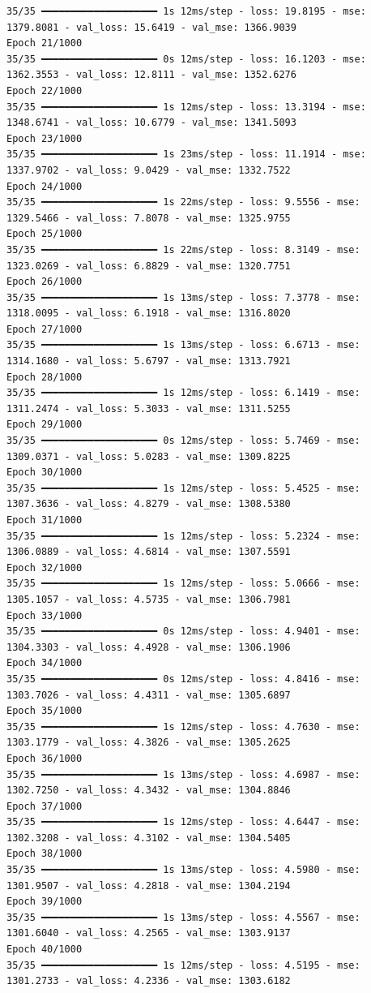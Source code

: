 \documentclass[
  letterpaper,
  DIV=11,
  numbers=noendperiod]{scrreprt}
\begin{document}
\begin{verbatim}
35/35 ━━━━━━━━━━━━━━━━━━━━ 1s 12ms/step - loss: 19.8195 - mse: 1379.8081 - val_loss: 15.6419 - val_mse: 1366.9039
Epoch 21/1000
35/35 ━━━━━━━━━━━━━━━━━━━━ 0s 12ms/step - loss: 16.1203 - mse: 1362.3553 - val_loss: 12.8111 - val_mse: 1352.6276
Epoch 22/1000
35/35 ━━━━━━━━━━━━━━━━━━━━ 1s 12ms/step - loss: 13.3194 - mse: 1348.6741 - val_loss: 10.6779 - val_mse: 1341.5093
Epoch 23/1000
35/35 ━━━━━━━━━━━━━━━━━━━━ 1s 23ms/step - loss: 11.1914 - mse: 1337.9702 - val_loss: 9.0429 - val_mse: 1332.7522
Epoch 24/1000
35/35 ━━━━━━━━━━━━━━━━━━━━ 1s 22ms/step - loss: 9.5556 - mse: 1329.5466 - val_loss: 7.8078 - val_mse: 1325.9755
Epoch 25/1000
35/35 ━━━━━━━━━━━━━━━━━━━━ 1s 22ms/step - loss: 8.3149 - mse: 1323.0269 - val_loss: 6.8829 - val_mse: 1320.7751
Epoch 26/1000
35/35 ━━━━━━━━━━━━━━━━━━━━ 1s 13ms/step - loss: 7.3778 - mse: 1318.0095 - val_loss: 6.1918 - val_mse: 1316.8020
Epoch 27/1000
35/35 ━━━━━━━━━━━━━━━━━━━━ 1s 13ms/step - loss: 6.6713 - mse: 1314.1680 - val_loss: 5.6797 - val_mse: 1313.7921
Epoch 28/1000
35/35 ━━━━━━━━━━━━━━━━━━━━ 1s 12ms/step - loss: 6.1419 - mse: 1311.2474 - val_loss: 5.3033 - val_mse: 1311.5255
Epoch 29/1000
35/35 ━━━━━━━━━━━━━━━━━━━━ 0s 12ms/step - loss: 5.7469 - mse: 1309.0371 - val_loss: 5.0283 - val_mse: 1309.8225
Epoch 30/1000
35/35 ━━━━━━━━━━━━━━━━━━━━ 1s 12ms/step - loss: 5.4525 - mse: 1307.3636 - val_loss: 4.8279 - val_mse: 1308.5380
Epoch 31/1000
35/35 ━━━━━━━━━━━━━━━━━━━━ 1s 12ms/step - loss: 5.2324 - mse: 1306.0889 - val_loss: 4.6814 - val_mse: 1307.5591
Epoch 32/1000
35/35 ━━━━━━━━━━━━━━━━━━━━ 1s 12ms/step - loss: 5.0666 - mse: 1305.1057 - val_loss: 4.5735 - val_mse: 1306.7981
Epoch 33/1000
35/35 ━━━━━━━━━━━━━━━━━━━━ 0s 12ms/step - loss: 4.9401 - mse: 1304.3303 - val_loss: 4.4928 - val_mse: 1306.1906
Epoch 34/1000
35/35 ━━━━━━━━━━━━━━━━━━━━ 0s 12ms/step - loss: 4.8416 - mse: 1303.7026 - val_loss: 4.4311 - val_mse: 1305.6897
Epoch 35/1000
35/35 ━━━━━━━━━━━━━━━━━━━━ 1s 12ms/step - loss: 4.7630 - mse: 1303.1779 - val_loss: 4.3826 - val_mse: 1305.2625
Epoch 36/1000
35/35 ━━━━━━━━━━━━━━━━━━━━ 1s 13ms/step - loss: 4.6987 - mse: 1302.7250 - val_loss: 4.3432 - val_mse: 1304.8846
Epoch 37/1000
35/35 ━━━━━━━━━━━━━━━━━━━━ 1s 12ms/step - loss: 4.6447 - mse: 1302.3208 - val_loss: 4.3102 - val_mse: 1304.5405
Epoch 38/1000
35/35 ━━━━━━━━━━━━━━━━━━━━ 1s 13ms/step - loss: 4.5980 - mse: 1301.9507 - val_loss: 4.2818 - val_mse: 1304.2194
Epoch 39/1000
35/35 ━━━━━━━━━━━━━━━━━━━━ 1s 13ms/step - loss: 4.5567 - mse: 1301.6040 - val_loss: 4.2565 - val_mse: 1303.9137
Epoch 40/1000
35/35 ━━━━━━━━━━━━━━━━━━━━ 1s 12ms/step - loss: 4.5195 - mse: 1301.2733 - val_loss: 4.2336 - val_mse: 1303.6182

\end{verbatim}
\end{document}
